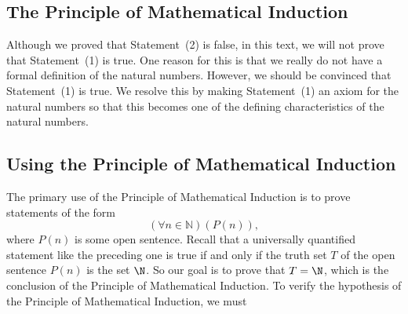 \subsection*{The Principle of Mathematical Induction}
Although we proved that Statement~(2) is false, in this text, we will not prove that Statement~(1) is true.  One reason for this is that we really do not have a formal definition of the natural numbers.  However, we should be convinced that Statement~(1) is true.  We resolve this by making Statement~(1) an axiom for the natural numbers so that this becomes one of the defining characteristics of the natural numbers.
\begin{flushleft}
\end{flushleft}
%
\subsection*{Using the Principle of Mathematical Induction}
The primary use of the Principle of Mathematical Induction is to prove statements of the form
\[
\left( {\forall n \in \mathbb{N}} \right)\left( {P\left( n \right)} \right),
\]
where  $P( n )$ is some open sentence.  Recall that a universally quantified statement like the preceding one is true if and only if the truth set  $T$  of the open sentence $P( n )$ is the set  $\N$.  So our goal is to prove that  $T = \N$, which is the conclusion of the Principle of Mathematical Induction.  To verify the hypothesis of the Principle of Mathematical Induction, we must


